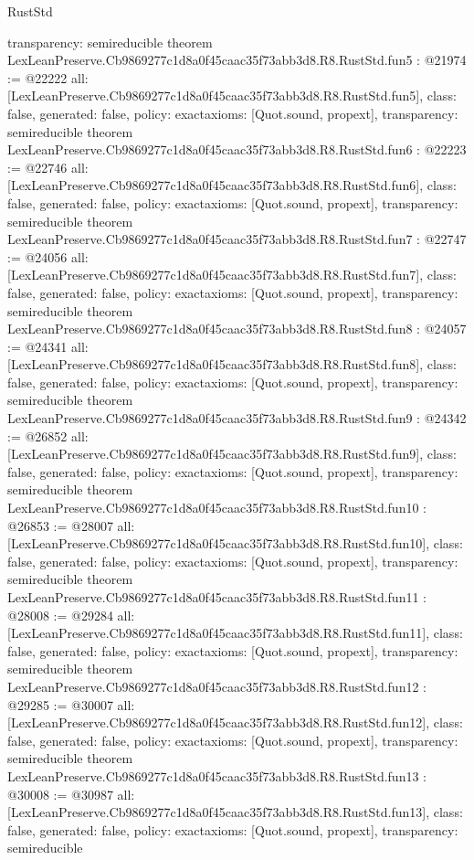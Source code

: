 \begin{lexlean}{RustStd}
\begin{coremodule}
{  transparency: semireducible
}
theorem LexLeanPreserve.Cb9869277c1d8a0f45caac35f73abb3d8.R8.RustStd.fun5 : @21974 := @22222 {
  all: [LexLeanPreserve.Cb9869277c1d8a0f45caac35f73abb3d8.R8.RustStd.fun5],
  class: false,
  generated: false,
  policy: exact{axioms: [Quot.sound, propext]},
  transparency: semireducible
}
theorem LexLeanPreserve.Cb9869277c1d8a0f45caac35f73abb3d8.R8.RustStd.fun6 : @22223 := @22746 {
  all: [LexLeanPreserve.Cb9869277c1d8a0f45caac35f73abb3d8.R8.RustStd.fun6],
  class: false,
  generated: false,
  policy: exact{axioms: [Quot.sound, propext]},
  transparency: semireducible
}
theorem LexLeanPreserve.Cb9869277c1d8a0f45caac35f73abb3d8.R8.RustStd.fun7 : @22747 := @24056 {
  all: [LexLeanPreserve.Cb9869277c1d8a0f45caac35f73abb3d8.R8.RustStd.fun7],
  class: false,
  generated: false,
  policy: exact{axioms: [Quot.sound, propext]},
  transparency: semireducible
}
theorem LexLeanPreserve.Cb9869277c1d8a0f45caac35f73abb3d8.R8.RustStd.fun8 : @24057 := @24341 {
  all: [LexLeanPreserve.Cb9869277c1d8a0f45caac35f73abb3d8.R8.RustStd.fun8],
  class: false,
  generated: false,
  policy: exact{axioms: [Quot.sound, propext]},
  transparency: semireducible
}
theorem LexLeanPreserve.Cb9869277c1d8a0f45caac35f73abb3d8.R8.RustStd.fun9 : @24342 := @26852 {
  all: [LexLeanPreserve.Cb9869277c1d8a0f45caac35f73abb3d8.R8.RustStd.fun9],
  class: false,
  generated: false,
  policy: exact{axioms: [Quot.sound, propext]},
  transparency: semireducible
}
theorem LexLeanPreserve.Cb9869277c1d8a0f45caac35f73abb3d8.R8.RustStd.fun10 : @26853 := @28007 {
  all: [LexLeanPreserve.Cb9869277c1d8a0f45caac35f73abb3d8.R8.RustStd.fun10],
  class: false,
  generated: false,
  policy: exact{axioms: [Quot.sound, propext]},
  transparency: semireducible
}
theorem LexLeanPreserve.Cb9869277c1d8a0f45caac35f73abb3d8.R8.RustStd.fun11 : @28008 := @29284 {
  all: [LexLeanPreserve.Cb9869277c1d8a0f45caac35f73abb3d8.R8.RustStd.fun11],
  class: false,
  generated: false,
  policy: exact{axioms: [Quot.sound, propext]},
  transparency: semireducible
}
theorem LexLeanPreserve.Cb9869277c1d8a0f45caac35f73abb3d8.R8.RustStd.fun12 : @29285 := @30007 {
  all: [LexLeanPreserve.Cb9869277c1d8a0f45caac35f73abb3d8.R8.RustStd.fun12],
  class: false,
  generated: false,
  policy: exact{axioms: [Quot.sound, propext]},
  transparency: semireducible
}
theorem LexLeanPreserve.Cb9869277c1d8a0f45caac35f73abb3d8.R8.RustStd.fun13 : @30008 := @30987 {
  all: [LexLeanPreserve.Cb9869277c1d8a0f45caac35f73abb3d8.R8.RustStd.fun13],
  class: false,
  generated: false,
  policy: exact{axioms: [Quot.sound, propext]},
  transparency: semireducible
}
\end{coremodule}
\end{lexlean}
